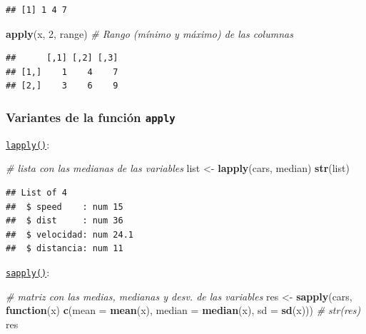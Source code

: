 \documentclass[
]{book}
\newenvironment{Shaded}{\begin{snugshade}}{\end{snugshade}}
\newcommand{\CommentTok}[1]{\textcolor[rgb]{0.56,0.35,0.01}{\textit{#1}}}
\newcommand{\ControlFlowTok}[1]{\textcolor[rgb]{0.13,0.29,0.53}{\textbf{#1}}}
\newcommand{\DataTypeTok}[1]{\textcolor[rgb]{0.13,0.29,0.53}{#1}}
\newcommand{\DecValTok}[1]{\textcolor[rgb]{0.00,0.00,0.81}{#1}}
\newcommand{\KeywordTok}[1]{\textcolor[rgb]{0.13,0.29,0.53}{\textbf{#1}}}
\newcommand{\NormalTok}[1]{#1}
\newcommand{\StringTok}[1]{\textcolor[rgb]{0.31,0.60,0.02}{#1}}
\begin{document}
\begin{verbatim}
## [1] 1 4 7
\end{verbatim}

\begin{Shaded}
\begin{Highlighting}[]
\KeywordTok{apply}\NormalTok{(x, }\DecValTok{2}\NormalTok{, range)  }\CommentTok{# Rango (mínimo y máximo) de las columnas}
\end{Highlighting}
\end{Shaded}

\begin{verbatim}
##      [,1] [,2] [,3]
## [1,]    1    4    7
## [2,]    3    6    9
\end{verbatim}

\hypertarget{variantes-de-la-funciuxf3n-apply}{%
\subsubsection{\texorpdfstring{Variantes de la función \texttt{apply}}{Variantes de la función apply}}\label{variantes-de-la-funciuxf3n-apply}}

\href{https://www.rdocumentation.org/packages/base/versions/3.6.1/topics/lapply}{\texttt{lapply()}}:

\begin{Shaded}
\begin{Highlighting}[]
\CommentTok{# lista con las medianas de las variables}
\NormalTok{list <-}\StringTok{ }\KeywordTok{lapply}\NormalTok{(cars, median)}
\KeywordTok{str}\NormalTok{(list)}
\end{Highlighting}
\end{Shaded}

\begin{verbatim}
## List of 4
##  $ speed    : num 15
##  $ dist     : num 36
##  $ velocidad: num 24.1
##  $ distancia: num 11
\end{verbatim}

\href{https://www.rdocumentation.org/packages/base/versions/3.6.1/topics/sapply}{\texttt{sapply()}}:

\begin{Shaded}
\begin{Highlighting}[]
\CommentTok{# matriz con las medias, medianas y desv. de las variables}
\NormalTok{res <-}\StringTok{ }\KeywordTok{sapply}\NormalTok{(cars, }
          \ControlFlowTok{function}\NormalTok{(x) }\KeywordTok{c}\NormalTok{(}\DataTypeTok{mean =} \KeywordTok{mean}\NormalTok{(x), }\DataTypeTok{median =} \KeywordTok{median}\NormalTok{(x), }\DataTypeTok{sd =} \KeywordTok{sd}\NormalTok{(x)))}
\CommentTok{# str(res)}
\NormalTok{res}
\end{Highlighting}
\end{Shaded}
\end{document}
